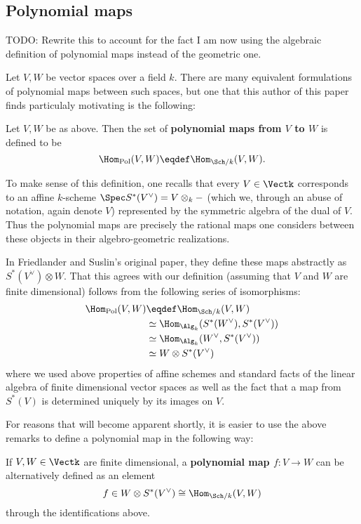 \documentclass[12pt]{article}
\begin{document}
\subsection{Polynomial maps}
{\color{red} TODO: Rewrite this to account for the fact I am now using the algebraic definition of polynomial maps instead of the geometric one.}

Let $V,W$ be vector spaces over a field $k$. There are many equivalent formulations of polynomial maps between such spaces, 
but one that this author of this paper finds particulaly motivating is the following:
\begin{defn}\label{defn:poly-maps}
	Let $V,W$ be as above. Then the set of \textbf{polynomial maps from $V$ to $W$} is defined to be 
	\[\Hom_\text{Pol}(V,W)\eqdef \Hom_{\Sch/k}(V,W).\]
\end{defn}

To make sense of this definition, one recalls that every $V\in\Vectk$ corresponds to an affine $k$-scheme 
$\Spec S^\ast(V^\vee)=V\otimes_k-$ (which we, through an abuse of notation, again denote $V$) represented by the symmetric algebra of the dual of $V$. Thus the polynomial maps
are precisely the rational maps one considers between these objects in their algebro-geometric realizations.

\begin{rmk}
	In Friedlander and Suslin's original paper, they define these maps abstractly as $S^\ast(V^\vee)\otimes W$. That this 
	agrees with our definition (assuming that $V$ and $W$ are finite dimensional) follows from the following series of isomorphisms:
	\begin{align*}
		\Hom_\text{Pol}(V,W)&\eqdef\Hom_{\Sch/k}(V,W)\\
		&\simeq\Hom_{\Alg_k}(S^\ast(W^\vee),S^\ast(V^\vee))\\
		&\simeq\Hom_{\Alg_k}(W^\vee,S^\ast(V^\vee))\\
		&\simeq W\otimes S^\ast(V^\vee)
	\end{align*}
	where we used above properties of affine schemes and standard facts of the linear algebra of finite dimensional vector spaces as well as the fact that 
	a map from $S^\ast(V)$ is determined uniquely by its images on $V$.
\end{rmk}
For reasons that will become apparent shortly, it is easier to use the above remarks to define a 
polynomial map in the following way:
\begin{defn}
	If $V,W\in\Vectk$ are finite dimensional, a \textbf{polynomial map $f:V\to W$} can be alternatively defined as an element 
	\[f\in W\otimes S^\ast(V^\vee)\cong\Hom_{\Sch/k}(V,W)\]
	through the identifications above.
\end{defn}
\end{document}
